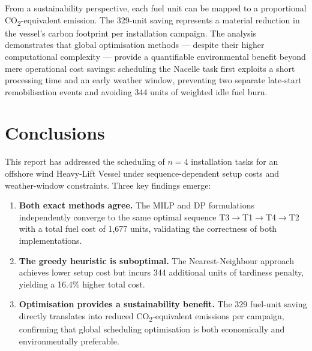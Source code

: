 \documentclass[11pt,a4paper]{article}
\begin{document}
\FloatBarrier

From a sustainability perspective, each fuel unit can be mapped to a
proportional CO\textsubscript{2}-equivalent emission. The 329-unit saving
represents a material reduction in the vessel's carbon footprint per
installation campaign. The analysis demonstrates that global optimisation
methods — despite their higher computational complexity — provide a
quantifiable environmental benefit beyond mere operational cost savings:
scheduling the Nacelle task first exploits a short processing time and an
early weather window, preventing two separate late-start remobilisation events
and avoiding 344 units of weighted idle fuel burn.

\section{Conclusions}
This report has addressed the scheduling of $n = 4$ installation tasks for an
offshore wind Heavy-Lift Vessel under sequence-dependent setup costs and
weather-window constraints. Three key findings emerge:

\begin{enumerate}
    \item \textbf{Both exact methods agree.} The MILP and DP formulations
          independently converge to the same optimal sequence
          T3$\to$T1$\to$T4$\to$T2 with a total fuel cost of 1{,}677 units,
          validating the correctness of both implementations.
    \item \textbf{The greedy heuristic is suboptimal.} The Nearest-Neighbour
          approach achieves lower setup cost but incurs 344 additional units
          of tardiness penalty, yielding a 16.4\% higher total cost.
    \item \textbf{Optimisation provides a sustainability benefit.} The 329
          fuel-unit saving directly translates into reduced
          CO\textsubscript{2}-equivalent emissions per campaign, confirming
          that global scheduling optimisation is both economically and
          environmentally preferable.
\end{enumerate}
\end{document}
